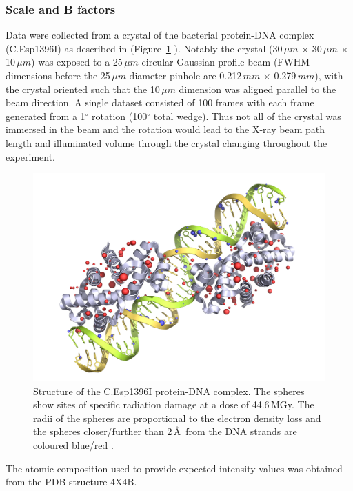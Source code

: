 \subsubsection{Scale and B factors}
\label{subs:Scale and B factors - C.Esp1396I}
Data were collected from a crystal of the bacterial protein-DNA complex (C.Esp1396I) as described in \cite{bury2015radiation} (Figure~\ref{fig:C.Esp1396I structure} ).
Notably the crystal (30$\,\mu m$ $\times$ 30$\,\mu m$ $\times$ 10$\,\mu m$) was exposed to a 25$\,\mu m$ circular Gaussian profile beam (FWHM dimensions before the 25$\,\mu m$ diameter pinhole are 0.212$\,mm$ $\times$ 0.279$\,mm$), with the crystal oriented such that the 10$\,\mu m$ dimension was aligned parallel to the beam direction.
A single dataset consisted of 100 frames with each frame generated from a 1$^{\circ}$ rotation (100$^{\circ}$ total wedge).
Thus not all of the crystal was immersed in the beam and the rotation would lead to the X-ray beam path length and illuminated volume through the crystal changing throughout the experiment.
\begin{figure}[ht!]
    \centering
    \includegraphics[width=1.0\textwidth]{figures/datared/JSRcoverpic_nobackground.png}
    \caption[Structure of the C.Esp1396I protein-DNA complex.]{Structure of the C.Esp1396I protein-DNA complex.
    The spheres show sites of specific radiation damage at a dose of 44.6$\,$MGy.
    The radii of the spheres are proportional to the electron density loss and the spheres closer/further than 2$\,$\AA\ from the DNA strands are coloured blue/red \cite{bury2015radiation}.}
    \label{fig:C.Esp1396I structure}
\end{figure}
The atomic composition used to provide expected intensity values was obtained from the PDB structure 4X4B.
